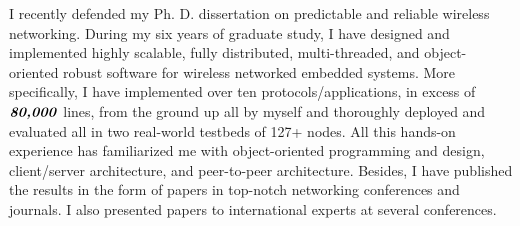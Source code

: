\documentclass[12pt]{letter} %
\begin{document}
\begin{letter}
I recently defended my Ph. D. dissertation on predictable and reliable wireless networking. During my six years of graduate study, I have designed and implemented highly scalable, fully distributed, multi-threaded, and object-oriented robust software for wireless networked embedded systems. More specifically, I have implemented over ten protocols/applications, in excess of $\textbf{\textit{80,000}}$ lines, from the ground up all by myself and thoroughly deployed and evaluated all in two real-world testbeds of 127+ nodes. All this hands-on experience has familiarized me with object-oriented programming and design, client/server architecture, and peer-to-peer architecture.
Besides, I have published the results in the form of papers in top-notch networking conferences and journals. I also presented papers to international experts at several conferences.


\end{letter}
\end{document}
